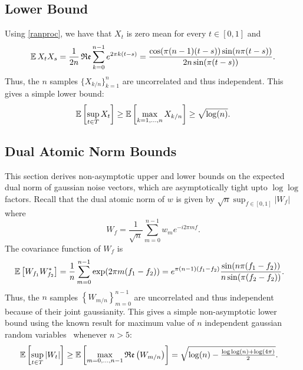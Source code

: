 \subsection{Lower Bound}
Using \eqref{ranproc}, we have that $X_t$ is zero mean for every $t \in [0,1]$ and
\begin{equation}
\operatorname{\mathbb{E}} X_t X_s = \frac{1}{2 n}\mathop{\mathfrak{Re}} {\sum_{k=0}^{n-1} e^{2 \pi k (t - s) } } = \frac{ \cos(\pi (n - 1) (t-s)) \sin(n \pi (t - s) ) }{2 n \sin(\pi (t - s))}.
\end{equation}
Thus, the $n$ samples $\{ X_{k/n} \}_{k=1}^{n}$ are uncorrelated and thus independent. This gives a simple lower bound:
\begin{equation}
\operatorname{\mathbb{E}}\left[\sup_{t \in T} X_t \right] \geq \operatorname{\mathbb{E}}\left[\max_{k = 1, \ldots, n} X_{k/n} \right] \geq \sqrt{\log(n)}.
\end{equation}

\subsection{Dual Atomic Norm Bounds}
\label{proof:dual-norm-bounds}
This section derives non-asymptotic upper and lower bounds on the expected dual norm of gaussian noise vectors, which are asymptotically tight upto $\log\log$ factors. Recall that the dual atomic norm of $w$ is given by $\sqrt{n}\sup_{f \in [0,1]}|W_f|$ where
\begin{equation*}
W_f = \frac{1}{\sqrt{n}}\sum_{m=0}^{n-1}{w_m e^{-i2 \pi m f}}.
\end{equation*}
The covariance function of $W_f$ is
\begin{align*}
\operatorname{\mathbb{E}}\left[W_{f_1} W_{f_2}^*\right] &= \frac{1}{n}\sum_{m=0}^{n-1} \exp(2\pi m (f_1 - f_2)) = e^{\pi (n - 1) (f_1-f_2)} \frac{\sin(n \pi (f_1 - f_2) ) }{ n \sin(\pi (f_2 - f_2))}.
\end{align*}
Thus, the $n$ samples $\left\{W_{m/n}\right\}_{m=0}^{n-1}$ are uncorrelated and thus independent because of their joint gaussianity. This gives a simple non-asymptotic lower bound using the known result for maximum value of $n$ independent gaussian random variables~\cite{lr76} whenever $n > 5$:
\begin{align*}
\operatorname{\mathbb{E}}\left[\sup_{t \in T} \left| W_t \right| \right] &\geq \operatorname{\mathbb{E}}\left[\max_{m = 0, \ldots, n-1} \mathop{\mathfrak{Re}}\left( W_{m/n} \right)  \right] = \sqrt{\log(n) - \tfrac{ \log\log(n) + \log(4\pi)}{2}}.
\end{align*}

